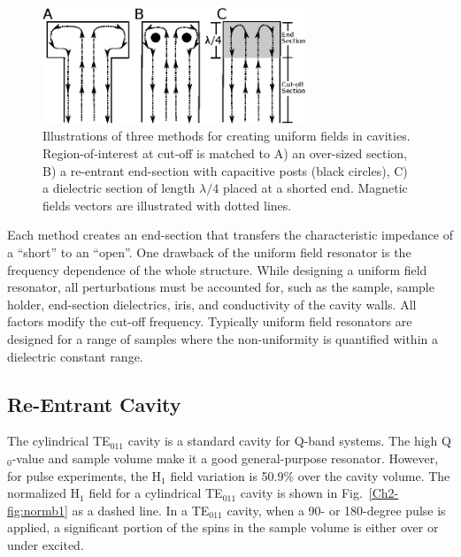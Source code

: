 \begin{figure}[htb]
 \centering
 \includegraphics[width=0.7\textwidth]{Kapitel/Ch2-Images/02-UFIllustration.eps}
 \caption[Methods for creating uniform fields in cavities.]{Illustrations of three methods for creating uniform fields in cavities. Region-of-interest at cut-off is matched to A) an  over-sized section, B) a re-entrant end-section with capacitive posts (black circles), C) a dielectric section of length $\lambda/4$ placed at a shorted end. Magnetic fields vectors are illustrated with dotted lines.}
 \label{fig:UFmethods}
\end{figure}

Each method creates an end-section that transfers the characteristic impedance of a ``short'' to an ``open''. One drawback of the uniform field resonator is the frequency dependence of the whole structure. While designing a uniform field resonator, all perturbations must be accounted for, such as the sample, sample holder, end-section dielectrics, iris, and conductivity of the cavity walls. All factors modify the cut-off frequency. Typically uniform field resonators are designed for a range of samples where the non-uniformity is quantified within a dielectric constant range. 

\subsection{Re-Entrant \cylTE{} Cavity}
The cylindrical TE$_{011}$ cavity is a standard cavity for Q-band systems. The high Q$_0$-value and sample volume make it a good general-purpose resonator. However, for pulse experiments, the H$_1$ field variation is 50.9\% over the cavity volume. The normalized H$_1$ field for a cylindrical TE$_{011}$ cavity is shown in Fig.~\ref{Ch2-fig:normb1} as a dashed line. In a TE$_{011}$ cavity, when a 90- or 180-degree pulse is applied, a significant portion of the spins in the sample volume is either over or under excited. 

